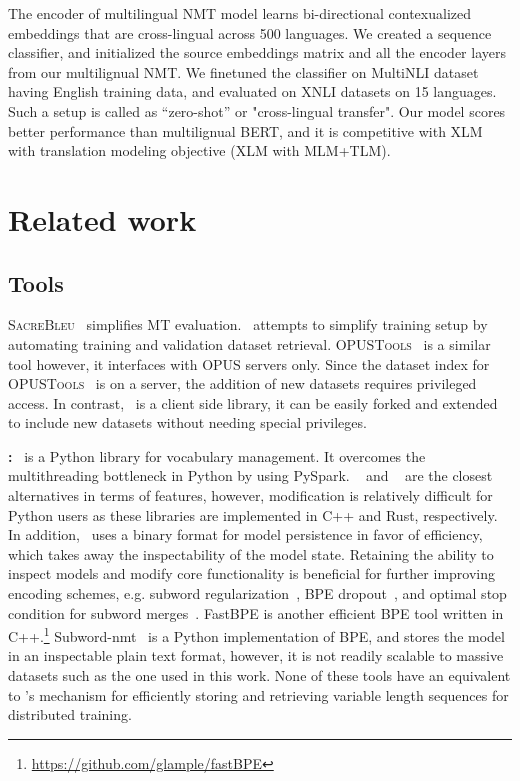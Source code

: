 The encoder of multilingual NMT model learns bi-directional contexualized embeddings that are cross-lingual across 500 languages.
We created a sequence classifier, and initialized the source embeddings matrix and all the encoder layers from our multilignual NMT. 
We finetuned the classifier on MultiNLI dataset having English training data, and evaluated on XNLI datasets on 15 languages. 
Such a setup is called as ``zero-shot'' or "cross-lingual transfer". 
Our model scores better performance than multilignual BERT, and it is competitive with XLM with translation modeling objective (XLM with MLM+TLM).



\section{Related work}

\subsection{Tools}
\textsc{SacreBleu}~\cite{post-2018-sacrebleu} simplifies MT evaluation.
\mtdata\ attempts to simplify training setup by automating training and validation dataset retrieval.
\textsc{OPUSTools}~\cite{aulamo-etal-2020-opustools} is a similar tool however, it interfaces with OPUS servers only.
Since the dataset index for \textsc{OPUSTools}~ is on a server, the addition of new datasets requires privileged access.
In contrast, \mtdata\ is a client side library, it can be easily forked and extended to include new datasets without needing special privileges. 

\textbf{\nlcodec:} 
\nlcodec\ is a Python library for vocabulary management. It overcomes the multithreading bottleneck in Python by using PySpark.
\sentpiece~\cite{kudo-richardson-2018-sentencepiece} and \hftok~\cite{wolf-etal-2020-transformers} are the closest alternatives in terms of features, however, modification is relatively difficult for Python users as these libraries are implemented in C++ and Rust, respectively.
In addition, \sentpiece\ uses a binary format for model persistence in favor of efficiency, which takes away the inspectability of the model state. 
Retaining the ability to inspect models and modify core functionality is beneficial for further improving encoding schemes, e.g. subword regularization~\cite{kudo-2018-subwordreg}, BPE dropout~\cite{provilkov-etal-2020-bpedrop}, and optimal stop condition for subword merges~\cite{gowda-may-2020-finding}.
FastBPE is another efficient BPE tool written in C++.\footnote{\url{https://github.com/glample/fastBPE}}  
Subword-nmt~\cite{sennrich-etal-2016-bpe} is a Python implementation of BPE, and stores the model in an inspectable plain text format, however, it is not readily scalable to massive datasets such as the one used in this work.
None of these tools have an equivalent to \nldb's mechanism for efficiently storing and retrieving variable length sequences for distributed training.


